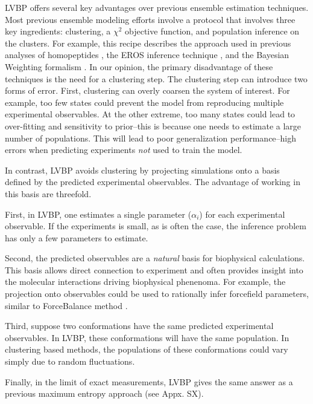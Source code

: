 \documentclass[journal=jacsat,manuscript=article]{achemso}
\begin{document}
LVBP offers several key advantages over previous ensemble estimation techniques.  Most previous ensemble modeling efforts involve a protocol that involves three key ingredients: clustering, a $\chi^2$ objective function, and population inference on the clusters.  For example, this recipe describes the approach used in previous analyses of homopeptides \cite{graf2005}, the EROS inference technique \cite{rozycki2011saxs}, and the Bayesian Weighting formalism \cite{fisher2010}.  In our opinion, the primary disadvantage of these techniques is the need for a clustering step.  The clustering step can introduce two forms of error.  First, clustering can overly coarsen the system of interest.  For example, too few states could prevent the model from reproducing multiple experimental observables.  At the other extreme, too many states could lead to over-fitting and sensitivity to prior--this is because one needs to estimate a large number of populations.  This will lead to poor generalization performance--high errors when predicting experiments \emph{not} used to train the model.  

In contrast, LVBP avoids clustering by projecting simulations onto a basis defined by the predicted experimental observables.  The advantage of working in this basis are threefold.  

First, in LVBP, one estimates a single parameter ($\alpha_i$) for each experimental observable.  If the experiments is small, as is often the case, the inference problem has only a few parameters to estimate.  

Second, the predicted observables are a \emph{natural} basis for biophysical calculations.  This basis allows direct connection to experiment and often provides insight into the molecular interactions driving biophysical phenenoma.  For example, the projection onto observables could be used to rationally infer forcefield parameters, similar to ForceBalance method \cite{LeePing}.  

Third, suppose two conformations have the same predicted experimental observables.  In LVBP, these conformations will have the same population.  In clustering based methods, the populations of these conformations could vary simply due to random fluctuations.  

Finally, in the limit of exact measurements, LVBP gives the same answer as a previous \cite{chodera2012} maximum entropy approach (see Appx. SX).  
\end{document}
